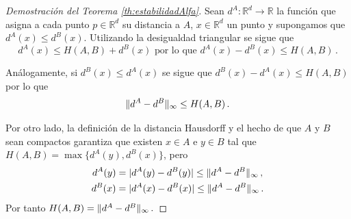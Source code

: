 \begin{proof}[Demostración del Teorema \ref{th:estabilidadAlfa}]
Sean $d^A: \mathbb{R}^d \to \mathbb{R}$ la función que asigna a cada punto $p \in \mathbb{R}^d$ su distancia a $A$, $x \in \mathbb{R}^d$ un punto y supongamos que $d^A(x) \leq d^B(x)$. Utilizando la desigualdad triangular se sigue que
\[
d^A(x) \leq H(A,B) + d^B(x) \text{ por lo que } d^A(x) - d^B(x) \leq H(A,B)\,.
\] 

Análogamente, si $d^B(x) \leq d^A(x)$ se sigue que $d^B(x) - d^A(x) \leq H(A,B)$ por lo que
\[
\lVert d^A- d^B\rVert_\infty \leq H(A,B)\,.
\] 

Por otro lado, la definición de la distancia Hausdorff y el hecho de que $A$ y $B$ sean compactos garantiza que existen $x\in A$ e $y \in B$ tal que $H(A,B)=\max\{d^A(y), d^B(x)\}$, pero
\begin{gather*}
d^A(y) = \lvert d^A(y) - d^B(y)\rvert \leq \lVert d^A - d^B\rVert_\infty\,,\\
d^B(x) = \lvert d^A(x) - d^B(x)\rvert \leq \lVert d^A - d^B\rVert_\infty\,.
\end{gather*}
Por tanto $H(A,B) = \lVert d^A - d^B\rVert_\infty\,.$


\end{proof}
